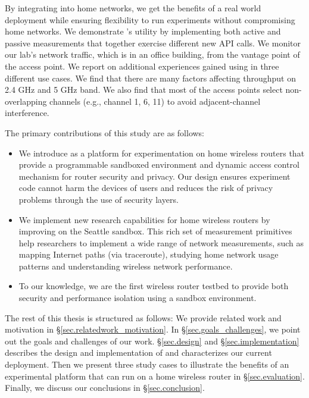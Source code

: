 By integrating \sysname into home networks, we get the benefits of a real world deployment while ensuring flexibility to run experiments without compromising home networks. We demonstrate \sysname's utility by implementing both active and passive measurements that together exercise different new API calls. We monitor our lab's network traffic, which is in an office building, from the vantage point of the access point. We report on additional experiences gained using \sysname in three different use cases. We find that there are many factors affecting throughput on 2.4 GHz and 5 GHz band. We also find that most of the access points select non-overlapping channels (e.g., channel 1, 6, 11) to avoid adjacent-channel interference. 


The primary contributions of this study are as follows:
\begin{itemize}
\item We introduce \sysname as a platform for experimentation on home wireless routers that provide a programmable sandboxed environment and dynamic access control mechanism for router security and privacy. Our design ensures experiment code cannot harm the devices of users and reduces the risk of privacy problems through the use of security layers.
\item We implement new research capabilities for home wireless routers by improving on the Seattle sandbox. This rich set of measurement primitives help researchers to implement a wide range of network measurements, such as mapping Internet paths (via traceroute), studying home network usage patterns and understanding wireless network performance.
\item To our knowledge, we are the first wireless router testbed to provide both security and performance isolation using a sandbox environment. 
\end{itemize}


The rest of this thesis is structured as follows: We provide related work and motivation in \S{\ref{sec.relatedwork_motivation}}. In \S{\ref{sec.goals_challenges}}, we point out the goals and challenges of our work. \S{\ref{sec.design}} and \S{\ref{sec.implementation}} describes the design and implementation of \sysname and characterizes our current deployment. Then we present three study cases to illustrate the benefits of an experimental platform that can run on a home wireless router in \S{\ref{sec.evaluation}}. Finally, we discuss our conclusions in \S{\ref{sec.conclusion}}. 